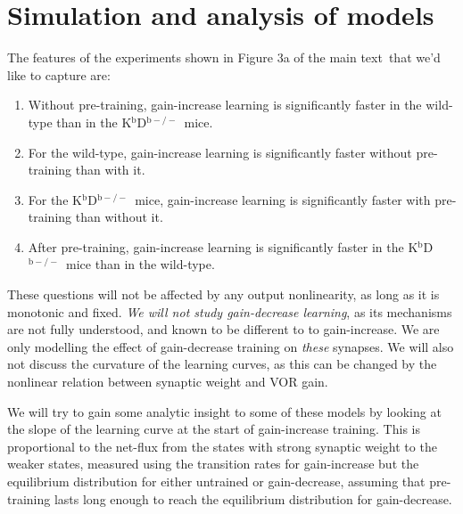 \documentclass[10pt]{article}
\newcommand{\KO}{K$^\mathrm{b}$D$^{\mathrm{b}-/-}$}
\newcommand{\modelfig}[1][a]{Figure 3#1 of the main text}
\begin{document}




\section{Simulation and analysis of models}\label{sec:results}

The features of the experiments shown in \modelfig\ that we'd like to capture are:
%
\begin{enumerate}
  \item Without pre-training, gain-increase learning is significantly faster in the wild-type than in the \KO\ mice.
  \item For the wild-type, gain-increase learning is significantly faster without pre-training than with it.
  \item For the \KO\ mice, gain-increase learning is significantly faster with pre-training than without it.
  \item After pre-training, gain-increase learning is significantly faster in the \KO\ mice than in the wild-type.
\end{enumerate}
%
These questions will not be affected by any output nonlinearity, as long as it is monotonic and fixed.
\emph{We will not study gain-decrease learning}, as its mechanisms are not fully understood, and known to be different to to gain-increase.
We are only modelling the effect of gain-decrease training on \emph{these} synapses.
We will also not discuss the curvature of the learning curves, as this can be changed by the nonlinear relation between synaptic weight and VOR gain.

We will try to gain some analytic insight to some of these models by looking at the slope of the learning curve at the start of gain-increase training.
This is proportional to the net-flux from the states with strong synaptic weight to the weaker states, measured using the transition rates for gain-increase but the equilibrium distribution for either untrained or gain-decrease, assuming that pre-training lasts long enough to reach the equilibrium distribution for gain-decrease.
\end{document}
